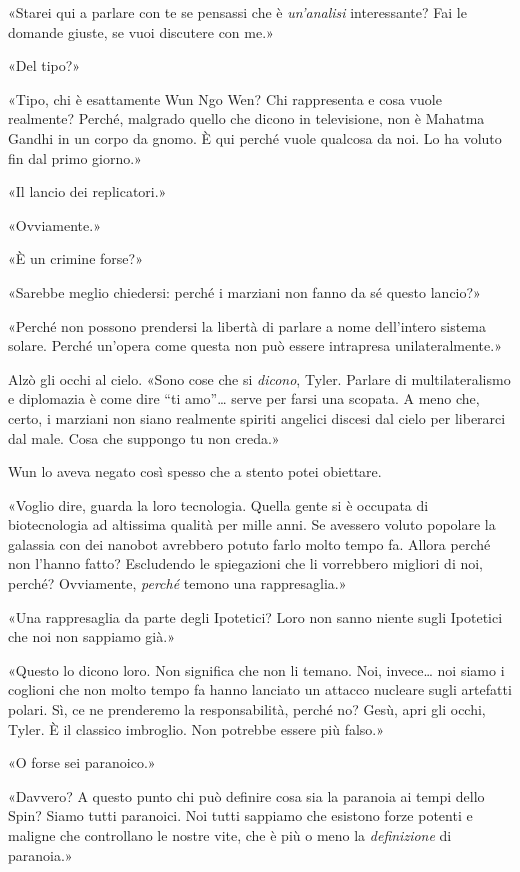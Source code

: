 «Starei qui a parlare con te se pensassi che è \emph{un'analisi}
interessante? Fai le domande giuste, se vuoi discutere con me.»

«Del tipo?»

«Tipo, chi è esattamente Wun Ngo Wen? Chi rappresenta e cosa vuole
realmente? Perché, malgrado quello che dicono in televisione, non è
Mahatma Gandhi in un corpo da gnomo. È qui perché vuole qualcosa da noi.
Lo ha voluto fin dal primo giorno.»

«Il lancio dei replicatori.»

«Ovviamente.»

«È un crimine forse?»

«Sarebbe meglio chiedersi: perché i marziani non fanno da sé questo
lancio?»

«Perché non possono prendersi la libertà di parlare a nome dell'intero
sistema solare. Perché un'opera come questa non può essere intrapresa
unilateralmente.»

Alzò gli occhi al cielo. «Sono cose che si \emph{dicono}, Tyler. Parlare
di multilateralismo e diplomazia è come dire ``ti amo''\ldots{} serve
per farsi una scopata. A meno che, certo, i marziani non siano realmente
spiriti angelici discesi dal cielo per liberarci dal male. Cosa che
suppongo tu non creda.»

Wun lo aveva negato così spesso che a stento potei obiettare.

«Voglio dire, guarda la loro tecnologia. Quella gente si è occupata di
biotecnologia ad altissima qualità per mille anni. Se avessero voluto
popolare la galassia con dei nanobot avrebbero potuto farlo molto tempo
fa. Allora perché non l'hanno fatto? Escludendo le spiegazioni che li
vorrebbero migliori di noi, perché? Ovviamente, \emph{perché} temono una
rappresaglia.»

«Una rappresaglia da parte degli Ipotetici? Loro non sanno niente sugli
Ipotetici che noi non sappiamo già.»

«Questo lo dicono loro. Non significa che non li temano. Noi,
invece\ldots{} noi siamo i coglioni che non molto tempo fa hanno
lanciato un attacco nucleare sugli artefatti polari. Sì, ce ne
prenderemo la responsabilità, perché no? Gesù, apri gli occhi, Tyler. È
il classico imbroglio. Non potrebbe essere più falso.»

«O forse sei paranoico.»

«Davvero? A questo punto chi può definire cosa sia la paranoia ai tempi
dello Spin? Siamo tutti paranoici. Noi tutti sappiamo che esistono forze
potenti e maligne che controllano le nostre vite, che è più o meno la
\emph{definizione} di paranoia.»

